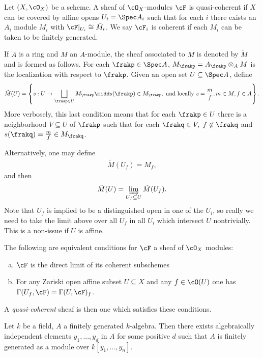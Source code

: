 \begin{defn}\label{defn:quasi-coh-Hart}
	Let $(X,\cO_X)$ be a scheme. A sheaf of $\cO_X$-modules $\cF$ is quasi-coherent if $X$ can be covered by affine opens $U_i = \Spec A_i$ such that for each $i$ there exists an $A_i$ module $M_i$ with $\cF|_{U_i} \cong \tilde{M_i}$. We say $\cF_i$ is coherent if each $M_i$ can be taken to be finitely generated.
\end{defn}
\begin{rmk}\label{rmk:sheaf-ass-to-M}
	If $A$ is a ring and $M$ an $A$-module, the sheaf associated to $M$ is denoted by $\tilde{M}$ and is formed as follows. For each $\frakp \in \Spec A$, $M_\frakp = A_{\frakp} \otimes_A M$ is the localization with respect to $\frakp$. Given an open set $U \subseteq \Spec A$, define
	\begin{align*}
        \tilde{M}(U) = \left\{s:U\to \bigsqcup_{\frakp \in U} M_\frakp \midd s(\frakp) \in M_\frakp, \text{ and locally } s = \frac{m}{f}, m \in M, f \in A\right\}.
	\end{align*}
	More verbosely, this last condition means that for each $\frakp \in U$ there is a neighborhood $V \subseteq U$ of $\frakp$ such that for each $\frakq \in V,$ $f\not\in \frakq$ and $s(\frakq) = \frac{m}{f} \in M_\frakq$.

	Alternatively, one may define
	\begin{align*}
	    \tilde{M}(U_f) = M_f,
	\end{align*}
	and then
	\begin{align*}
	    \tilde{M}(U) = \varinjlim_{U_f \subseteq U} \tilde{M}(U_f).
	\end{align*}
	Note that $U_f$ is implied to be a distinguished open in one of the $U_i$, so really we need to take the limit above over all $U_f$ in all $U_i$ which intersect $U$ nontrivially. This is a non-issue if $U$ is affine.
\end{rmk}
\begin{lem}\label{lem:ginzburg-characterization-of-quasi-coh}
	The following are equivalent conditions for $\cF$ a sheaf of $\cO_X$ modules:
	\begin{enumerate}[(a)]
		\item $\cF$ is the direct limit of its coherent subschemes
		\item For any Zariski open affine subset $U\subseteq X$ and any $f \in \cO(U)$ one has $\Gamma(U_f, \cF) = \Gamma(U,\cF)_f$.
	\end{enumerate}
	A \textit{quasi-coherent} sheaf is then one which satisfies these conditions. 
\end{lem}
\begin{lem}\label{lem:Noeth-Normal}
	Let $k$ be a field, $A$ a finitely generated $k$-algebra. Then there exists algebraically independent elements $y_1, ..., y_d$ in $A$ for some positive $d$ such that $A$ is finitely generated as a module over $k[y_1,...,y_n]$.
\end{lem}

